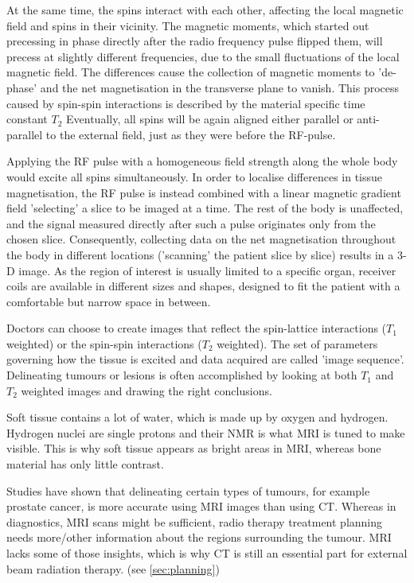 At the same time, the spins interact with each other, affecting the local magnetic field and spins in their vicinity.
The magnetic moments, which started out precessing in phase directly after the radio frequency pulse flipped them, will precess at slightly different frequencies, due to the small fluctuations of the local magnetic field.
The differences cause the collection of magnetic moments to 'de-phase' and the net magnetisation in the transverse plane to vanish.
This process caused by spin-spin interactions is described by the material specific time constant $T_2$
Eventually, all spins will be again aligned either parallel or anti-parallel to the external field, just as they were before the RF-pulse.

Applying the RF pulse with a homogeneous field strength along the whole body would excite all spins simultaneously.
In order to localise differences in tissue magnetisation, the RF pulse is instead combined with a linear magnetic gradient field 'selecting' a slice to be imaged at a time.
The rest of the body is unaffected, and the signal measured directly after such a pulse originates only from the chosen slice.
Consequently, collecting data on the net magnetisation throughout the body in different locations ('scanning' the patient slice by slice) results in a 3-D image.
As the region of interest is usually limited to a specific organ, receiver coils are available in different sizes and shapes, designed to fit the patient with a comfortable but narrow space in between.

Doctors can choose to create images that reflect the spin-lattice interactions ($T_1$ weighted) or the spin-spin interactions ($T_2$ weighted). 
The set of parameters governing how the tissue is excited and data acquired are called 'image sequence'.
Delineating tumours or lesions is often accomplished by looking at both $T_1$ and $T_2$ weighted images and drawing the right conclusions.

Soft tissue contains a lot of water, which is made up by oxygen and hydrogen.
Hydrogen nuclei are single protons and their NMR is what MRI is tuned to make visible.
This is why soft tissue appears as bright areas in MRI, whereas bone material has only little contrast. \cite{Currie2013}

Studies have shown that delineating certain types of tumours, for example prostate cancer, is more accurate using MRI images than using CT. \cite{Rasch1999, Debois1999a, Roach1996}
Whereas in diagnostics, MRI scans might be sufficient, radio therapy treatment planning needs more/other information about the regions surrounding the tumour.
MRI lacks some of those insights, which is why CT is still an essential part for external beam radiation therapy. (see \ref{sec:planning})

